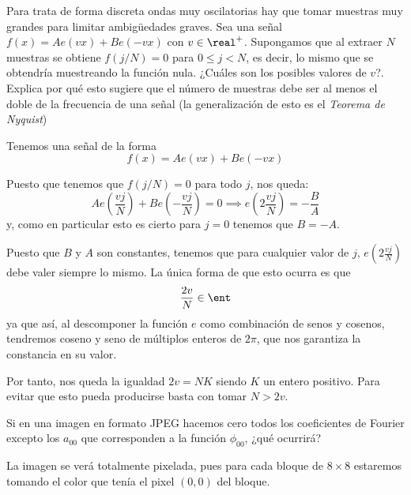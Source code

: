 \begin{problem}[5]
Para trata de forma discreta ondas muy oscilatorias hay que tomar muestras muy grandes para limitar ambigüedades graves. Sea una señal $f(x)=Ae(vx)+Be(-vx)$ con $v \in \real^+$. Supongamos que al extraer $N$ muestras se obtiene $f(j/N)=0$ para $0 \leq j < N$, es decir, lo mismo que se obtendría muestreando la función nula. ¿Cuáles son los posibles valores de $v$?. Explica por qué esto sugiere que el número de muestras debe ser al menos el doble de la frecuencia de una señal (la generalización de esto es el \textit{Teorema de Nyquist})
\solution

Tenemos una señal de la forma
\[f(x)=Ae(vx)+Be(-vx)\]

Puesto que tenemos que $f(j/N)=0$ para todo $j$, nos queda:
\[Ae\left(\frac{vj}{N}\right)+Be\left(-\frac{vj}{N}\right)=0 \implies e\left(2\frac{vj}{N}\right)=-\frac{B}{A}\]
y, como en particular esto es cierto para $j=0$ tenemos que $B=-A$.

Puesto que $B$ y $A$ son constantes, tenemos que para cualquier valor de $j$, $e\left(2\frac{vj}{N}\right)$ debe valer siempre lo mismo. La única forma de que esto ocurra es que
\[\frac{2v}{N}\in \ent\]
ya que así, al descomponer la función $e$ como combinación de senos y cosenos, tendremos coseno y seno de múltiplos enteros de $2π$, que nos garantiza la constancia en su valor.

Por tanto, nos queda la igualdad $2v=NK$ siendo $K$ un entero positivo. Para evitar que esto pueda producirse basta con tomar $N>2v$.
\end{problem}

\begin{problem}[6]
Si en una imagen en formato JPEG hacemos cero todos los coeficientes de Fourier excepto los $a_{00}$ que corresponden a la función $\phi_{00}$, ¿qué ocurrirá?
\solution

La imagen se verá totalmente pixelada, pues para cada bloque de $8\times 8$ estaremos tomando el color que tenía el pixel $(0,0)$ del bloque.

\end{problem}


